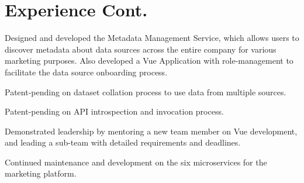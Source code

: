 \documentclass[letterpaper]{deedy-resume-openfont} %
\begin{document}

\newpage %


\section{Experience Cont.}
\sectionheadersep



\begin{tightemize}
\item Designed and developed the Metadata Management Service, which allows users to discover metadata about data sources across the entire company for various marketing purposes. Also developed a Vue Application with role-management to facilitate the data source onboarding process.
\item Patent-pending on dataset collation process to use data from multiple sources.
\item Patent-pending on API introspection and invocation process.
\item Demonstrated leadership by mentoring a new team member on Vue development, and leading a sub-team with detailed requirements and deadlines.
\item Continued maintenance and development on the six microservices for the marketing platform.
\end{tightemize}

\sectionsep %

\end{document}
